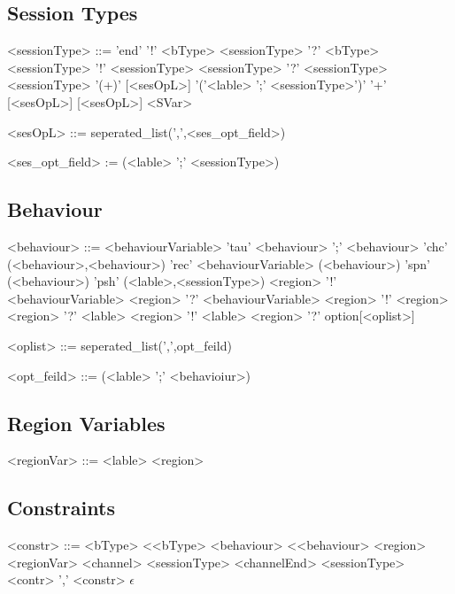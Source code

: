 \documentclass[12pt]{article}
\begin{document}
\subsection{Session Types}

\begin{grammar}

<sessionType> ::= 'end'
\alt '!' <bType> <sessionType>
\alt '?' <bType> <sessionType>
\alt '!' <sessionType> <sessionType>
\alt '?' <sessionType> <sessionType>
\alt '(+)' [<sesOpL>] '('<lable> ';' <sessionType>')'
\alt '+' [<sesOpL>] [<sesOpL>]
\alt <SVar>

<sesOpL> ::= seperated_list(',',<ses_opt_field>)

<ses_opt_field> := (<lable> ';' <sessionType>)

\end{grammar}

\subsection{Behaviour}

\begin{grammar}
\newpage
<behaviour> ::= <behaviourVariable>
\alt 'tau'
\alt <behaviour> ';' <behaviour>
\alt 'chc' (<behaviour>,<behaviour>)
\alt 'rec' <behaviourVariable> (<behaviour>)
\alt 'spn' (<behaviour>)
\alt 'psh' (<lable>,<sessionType>)
\alt <region> '!' <behaviourVariable>
\alt <region> '?' <behaviourVariable>
\alt <region> '!' <region>
\alt <region> '?' <lable>
\alt <region> '!' <lable>
\alt <region> '?' option[<oplist>]

<oplist> ::= seperated_list(',',opt_feild)

<opt_feild> ::= (<lable> ';' <behavioiur>)

\end{grammar}

\subsection {Region Variables}

\begin{grammar}

<regionVar> ::= <lable>
\alt <region>

\end{grammar}

\subsection{Constraints}

\begin{grammar}

<constr> ::= <bType> \textless <bType>
\alt <behaviour> \textless <behaviour>
\alt <region> \texttildelow <regionVar>
\alt <channel> \texttildelow <sessionType>
\alt <channelEnd> \texttildelow <sessionType>
\alt <contr> ',' <constr>
\alt $\epsilon$

\end{grammar}


\end{document}
